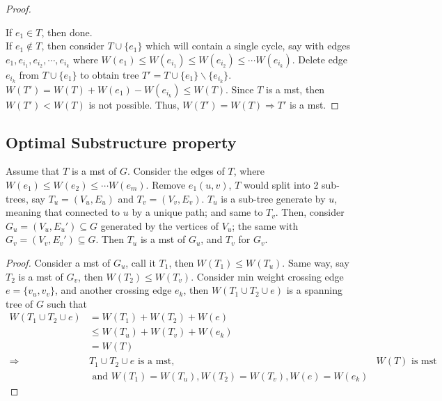 \documentclass[a4paper]{article}
\begin{document}
\begin{proof}
\begin{center}
\end{center}
If $e_1\in T$, then done. \\
If $e_1\notin T$, then consider $T\cup \{e_1\}$ which will contain a single cycle, say with edges $e_1,e_{i_1},e_{i_2},\cdots, e_{i_k}$ where $W(e_1)\leq W(e_{i_1})\leq W(e_{i_2})\leq \cdots W(e_{i_k})$. Delete edge $e_{i_k}$ from $T\cup \{e_1\}$ to obtain tree $T'=T\cup \{e_1\}\backslash \{e_{i_k}\}$. $W(T')=W(T)+W(e_1)-W(e_{i_k})\leq W(T)$.
Since $T$ is a mst, then $W(T')< W(T)$ is not possible. Thus, $W(T')=W(T)\Rightarrow T'$ is a mst.
\end{proof}
\subsection*{Optimal Substructure property}
Assume that $T$ is a mst of $G$. Consider the edges of $T$, where $W(e_1)\leq W(e_2)\leq \cdots W(e_m)$. Remove $e_1(u,v)$, $T$ would split into 2 sub-trees, say $T_u=(V_u,E_u)$ and $T_v=(V_v,E_v)$. $T_u$ is a sub-tree generate by $u$, meaning that connected to $u$ by a unique path; and same to $T_v$. Then, consider $G_u=(V_u,{E_u}')\subseteq G$ generated by the vertices of $V_u$; the same with $G_v=(V_v,{E_v}')\subseteq G$. Then $T_u$ is a mst of $G_u$, and $T_v$ for $G_v$.
\begin{proof}
Consider a mst of $G_u$, call it $T_1$, then $W(T_1)\leq W(T_u)$. Same way, say $T_2$ is a mst of $G_v$, then $W(T_2)\leq W(T_v)$. Consider min weight crossing edge $e=\{v_u,v_v\}$, and another crossing edge $e_k$, then $W(T_1\cup T_2\cup e)$ is a spanning tree of $G$ such that
\begin{align*}
    W(T_1\cup T_2\cup e)&=W(T_1)+W(T_2)+W(e)\\
    &\leq W(T_u)+W(T_v)+W(e_k)\\
    &=W(T)\\
    \Rightarrow&T_1\cup T_2\cup e \text{ is a mst,}& W(T)\text{ is mst}\\
    &\text{ and }W(T_1)=W(T_u),W(T_2)=W(T_v),W(e)=W(e_k)
\end{align*}
\end{proof}
\end{document}
